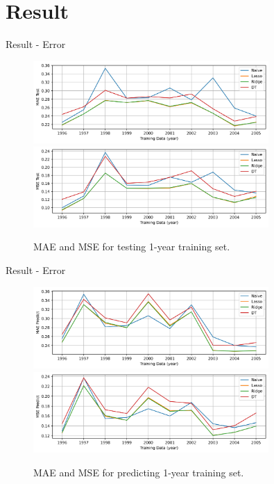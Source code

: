 \documentclass{beamer}
\begin{document}
\section{Result}

\begin{frame}{Result - Error}

  \begin{figure}[H]
    \centering
    \includegraphics[width=0.8\textwidth]{../Result/Res-1_MAE_test.jpg} \\
    \includegraphics[width=0.8\textwidth]{../Result/Res-1_MSE_test.jpg}
    \caption{MAE and MSE for testing 1-year training set.}
  \end{figure}

\end{frame}

\begin{frame}{Result - Error}

  \begin{figure}[H]
    \centering
    \includegraphics[width=0.8\textwidth]{../Result/Res-1_MAE_pred.jpg} \\
    \includegraphics[width=0.8\textwidth]{../Result/Res-1_MSE_pred.jpg}
    \caption{MAE and MSE for predicting 1-year training set.}
  \end{figure}

\end{frame}
\end{document}
